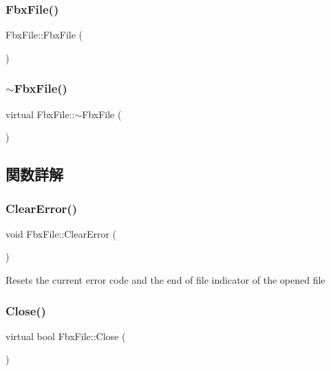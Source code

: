 \subsubsection{\texorpdfstring{Fbx\+File()}{FbxFile()}}
{\footnotesize\ttfamily Fbx\+File\+::\+Fbx\+File (\begin{DoxyParamCaption}{ }\end{DoxyParamCaption})}

\mbox{\label{class_fbx_file_a2dd86a0057e7caa4865a92508cc9b56d}} 
\subsubsection{\texorpdfstring{$\sim$\+Fbx\+File()}{~FbxFile()}}
{\footnotesize\ttfamily virtual Fbx\+File\+::$\sim$\+Fbx\+File (\begin{DoxyParamCaption}{ }\end{DoxyParamCaption})\hspace{0.3cm}{\ttfamily [virtual]}}



\subsection{関数詳解}
\mbox{\label{class_fbx_file_abaf8e0ca1c1f47a349848ec49966cc6a}} 
\subsubsection{\texorpdfstring{Clear\+Error()}{ClearError()}}
{\footnotesize\ttfamily void Fbx\+File\+::\+Clear\+Error (\begin{DoxyParamCaption}{ }\end{DoxyParamCaption})}

Resets the current error code and the end of file indicator of the opened file \mbox{\label{class_fbx_file_ae8028a6bb80f3ebe4f6fcbaab367228b}} 
\subsubsection{\texorpdfstring{Close()}{Close()}}
{\footnotesize\ttfamily virtual bool Fbx\+File\+::\+Close (\begin{DoxyParamCaption}{ }\end{DoxyParamCaption})\hspace{0.3cm}{\ttfamily [virtual]}}

